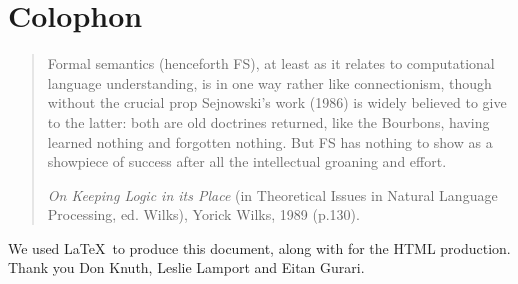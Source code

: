 
%
%
%
%


\chapter*{Colophon}
\markboth{}{}

\begin{quote}
Formal semantics (henceforth FS), at least as it relates to computational
language understanding, is in one way rather like
connectionism, though without the crucial prop Sejnowski's work (1986)
is widely believed to give to the latter: both are old
doctrines returned, like the Bourbons, having learned nothing and forgotten
nothing. But FS has nothing to show as a showpiece of
success after all the intellectual groaning and effort. 

{\it On Keeping Logic in its Place} (in Theoretical Issues in Natural Language
Processing, ed. Wilks), Yorick Wilks, 1989 (p.130).
\end{quote}


We used \LaTeX\ to produce this document, along with
for the HTML production. Thank you Don Knuth, Leslie Lamport and Eitan Gurari.

